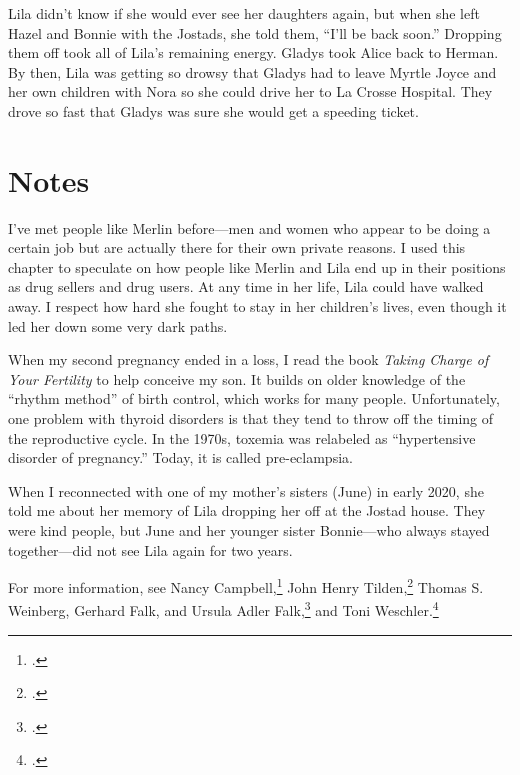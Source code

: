 \documentclass[
  american,
  letterpaper,
]{book}
\begin{document}
Lila didn't know if she would ever see her daughters again, but when she
left Hazel and Bonnie with the Jostads, she told them, ``I'll be back
soon.'' Dropping them off took all of Lila's remaining energy. Gladys
took Alice back to Herman. By then, Lila was getting so drowsy that
Gladys had to leave Myrtle Joyce and her own children with Nora so she
could drive her to La Crosse Hospital. They drove so fast that Gladys
was sure she would get a speeding ticket.

\section{Notes}\label{notes-56}

I've met people like Merlin before---men and women who appear to be
doing a certain job but are actually there for their own private
reasons. I used this chapter to speculate on how people like Merlin and
Lila end up in their positions as drug sellers and drug users. At any
time in her life, Lila could have walked away. I respect how hard she
fought to stay in her children's lives, even though it led her down some
very dark paths.

When my second pregnancy ended in a loss, I read the book \emph{Taking
Charge of Your Fertility} to help conceive my son. It builds on older
knowledge of the ``rhythm method'' of birth control, which works for
many people. Unfortunately, one problem with thyroid disorders is that
they tend to throw off the timing of the reproductive cycle. In the
1970s, toxemia was relabeled as ``hypertensive disorder of pregnancy.''
Today, it is called pre-eclampsia.

When I reconnected with one of my mother's sisters (June) in early 2020,
she told me about her memory of Lila dropping her off at the Jostad
house. They were kind people, but June and her younger sister
Bonnie---who always stayed together---did not see Lila again for two
years.

For more information, see Nancy Campbell,\footnote{.} John Henry Tilden,\footnote{.} Thomas S. Weinberg, Gerhard Falk, and Ursula
Adler Falk,\footnote{.}
and Toni Weschler.\footnote{.}
\end{document}
